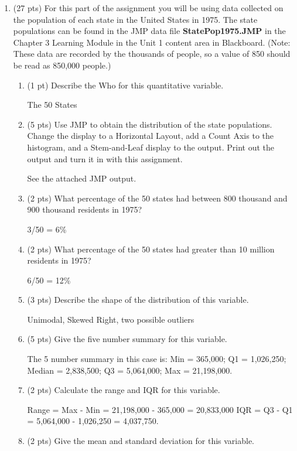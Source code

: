 \documentclass{article}[11pt]
\begin{document}
\begin{enumerate}
\item (27 pts) For this part of the assignment you will be using data collected on the population of each state in the United States in 1975.  The state populations can be found in the JMP data file {\bf StatePop1975.JMP} in the Chapter 3 Learning Module in the Unit 1 content area in Blackboard. (Note: These data are recorded by the thousands of people, so a value of 850 should be read as 850,000 people.)

\begin{enumerate}
\item (1 pt) Describe the Who for this quantitative variable.

The 50 States

\item (5 pts) Use JMP to obtain the distribution of the state populations.  Change the display to a Horizontal Layout, add a Count Axis to the histogram, and a Stem-and-Leaf display to the output.  Print out the output and turn it in with this assignment.

See the attached JMP output.

\item (2 pts) What percentage of the 50 states had between 800 thousand and 900 thousand residents in 1975?

3/50 = 6\% 

\item (2 pts) What percentage of the 50 states had greater than 10 million residents in 1975?

6/50 = 12\% 

\item (3 pts) Describe the shape of the distribution of this variable.

Unimodal, Skewed Right, two possible outliers

\item (5 pts) Give the five number summary for this variable.

The 5 number summary in this case is: Min = 365,000; Q1 = 1,026,250; Median = 2,838,500; Q3 = 5,064,000; Max = 21,198,000. 

\item (2 pts) Calculate the range and IQR for this variable.

Range = Max - Min = 21,198,000 - 365,000 = 20,833,000 \hspace{0.25in} IQR = Q3 - Q1 = 5,064,000 - 1,026,250 = 4,037,750.

\item (2 pts) Give the mean and standard deviation for this variable.


\end{enumerate}
\end{enumerate}
\end{document}
